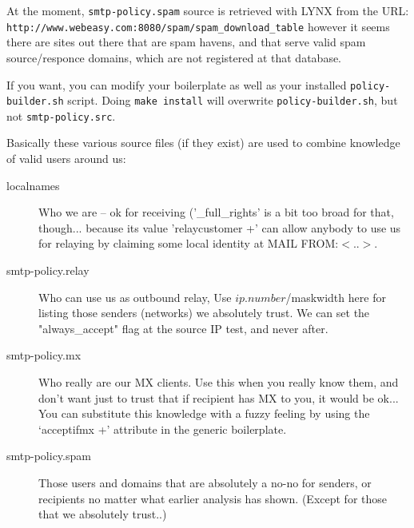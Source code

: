 At the moment, {\tt smtp-policy.spam} source is retrieved with LYNX from
the URL: {\tt http://www.webeasy.com:8080/spam/spam\_download\_table}
however it seems there are sites out there that are spam havens, and
that serve valid spam source/responce domains, which are not registered
at that database.

If you want, you can modify your boilerplate as well as your
installed {\tt policy-builder.sh} script. Doing {\tt make install} will
overwrite {\tt policy-builder.sh}, but not {\tt smtp-policy.src}.



Basically these various source files (if they exist) are used to
combine knowledge of valid users around us:

\begin{description}
\item[localnames] \mbox{}

Who we are -- ok for receiving ('\_full\_rights'
is a bit too broad for that, though... because
its value 'relaycustomer +' can allow anybody
to use us for relaying by claiming some local
identity at MAIL FROM:{\(<\)}..{\(>\)}.



\item[smtp-policy.relay] \mbox{}

Who can use us as outbound relay,
Use  $ip.number$/maskwidth  here for listing
those senders (networks) we absolutely trust.
We can set the "always\_accept" flag at the
source IP test, and never after.



\item[smtp-policy.mx] \mbox{}

Who really are our MX clients.
Use this when you really know them, and don't
want just to trust that if recipient has MX
to you, it would be ok...
You can substitute this knowledge with a fuzzy
feeling by using the `acceptifmx +' attribute in
the generic boilerplate.



\item[smtp-policy.spam] \mbox{}

Those users and domains that are
absolutely a no-no for senders, or recipients
no matter what earlier analysis has shown.
(Except for those that we absolutely trust..)

\end{description}





